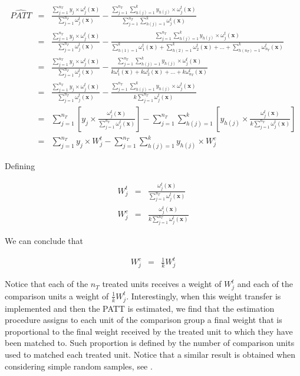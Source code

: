 \documentclass[oupdraft]{bio}
\begin{document}
\begin{eqnarray*}
\widehat{PATT} & = & \frac{\sum_{j=1}^{n_{T}}y_{j}\times\omega_{j}^{t}(\mathbf{x})}{\sum_{j=1}^{n_{T}}\omega_{j}^{t}(\mathbf{x})}-\frac{\sum_{j=1}^{n_{T}}\sum_{h(j)=1}^{k}y_{h(j)}\times\omega_{j}^{t}(\mathbf{x})}{\sum_{j=1}^{n_{T}}\sum_{h(j)=1}^{k}\omega_{j}^{t}(\mathbf{x})}\\
 & = & \frac{\sum_{j=1}^{n_{T}}y_{j}\times\omega_{j}^{t}(\mathbf{x})}{\sum_{j=1}^{n_{T}}\omega_{j}^{t}(\mathbf{x})}-\frac{\sum_{j=1}^{n_{T}}\sum_{h(j)=1}^{k}y_{h(j)}\times\omega_{j}^{t}(\mathbf{x})}{\sum_{h(1)=1}^{k}\omega_{1}^{t}(\mathbf{x})+\sum_{h(2)=1}^{k}\omega_{2}^{t}(\mathbf{x})+...+\sum_{h(n_{T})=1}^{k}\omega_{n_{T}}^{t}(\mathbf{x})}\\
 & = & \frac{\sum_{j=1}^{n_{T}}y_{j}\times\omega_{j}^{t}(\mathbf{x})}{\sum_{j=1}^{n_{T}}\omega_{j}^{t}(\mathbf{x})}-\frac{\sum_{j=1}^{n_{T}}\sum_{h(j)=1}^{k}y_{h(j)}\times\omega_{j}^{t}(\mathbf{x})}{k\omega_{1}^{t}(\mathbf{x})+k\omega_{2}^{t}(\mathbf{x})+...+k\omega_{n_{T}}^{t}(\mathbf{x})}\\
& = & \frac{\sum_{j=1}^{n_{T}}y_{j}\times\omega_{j}^{t}(\mathbf{x})}{\sum_{j=1}^{n_{T}}\omega_{j}^{t}(\mathbf{x})}-\frac{\sum_{j=1}^{n_{T}}\sum_{h(j)=1}^{k}y_{h(j)}\times\omega_{j}^{t}(\mathbf{x})}{k\sum_{j=1}^{n_{T}}\omega_{j}^{t}(\mathbf{x})}\\
 & = & \sum_{j=1}^{n_{T}}\left[y_{j}\times\frac{\omega_{j}^{t}(\mathbf{x})}{\sum_{j=1}^{n_{T}}\omega_{j}^{t}(\mathbf{x})}\right]-\sum_{j=1}^{n_{T}}\sum_{h(j)=1}^{k}\left[y_{h(j)}\times\frac{\omega_{j}^{t}(\mathbf{x})}{k\sum_{j=1}^{n_{T}}\omega_{j}^{t}(\mathbf{x})}\right]\\
 & = & \sum_{j=1}^{n_{T}}y_{j}\times W_{j}^{t}-\sum_{j=1}^{n_{T}}\sum_{h(j)=1}^{k}y_{h(j)}\times W_{j}^{c}
\end{eqnarray*}


Defining

\begin{eqnarray*}
W_{j}^{t} & = & \frac{\omega_{j}^{t}(\mathbf{x})}{\sum_{j=1}^{n_{T}}\omega_{j}^{t}(\mathbf{x})}\\
W_{j}^{c} & = & \frac{\omega_{j}^{t}(\mathbf{x})}{k\sum_{j=1}^{n_{T}}\omega_{j}^{t}(\mathbf{x})}
\end{eqnarray*}


We can conclude that

\begin{eqnarray*}
W_{j}^{c} & = & \frac{1}{k}W_{j}^{t}
\end{eqnarray*}

Notice that each of the $n_{T}$ treated units receives a weight of $W_{j}^{t}$ and each of the comparison units a weight of $\frac{1}{k}W_{j}^{t}$. Interestingly, when this weight transfer is implemented and then the PATT is estimated, we find that the estimation procedure assigns to each unit of the comparison group a final weight that is proportional to the final weight received by the treated unit to which they have been matched to. Such proportion is defined by the number of comparison units used to matched each treated unit. Notice that a similar result is obtained when considering simple random samples, see \citet{stuart2010matching}. 
\end{document}
